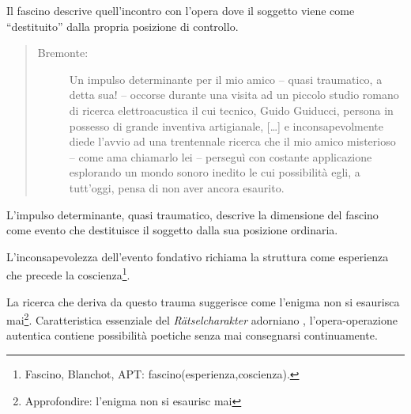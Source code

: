 Il fascino descrive quell'incontro con l'opera dove il soggetto viene come
“destituito” dalla propria posizione di controllo.

\begin{quote}
  \begin{sf}
    \small
    \begin{description}
      \item[Bremonte:] %
      Un impulso determinante per il mio amico – quasi traumatico, a detta sua! –
      occorse durante una visita ad un piccolo studio romano di ricerca
      elettroacustica il cui tecnico, Guido Guiducci, persona in possesso di
      grande inventiva artigianale,%
      [\ldots] e inconsapevolmente diede l’avvio ad una trentennale ricerca che il mio
      amico misterioso – come ama chiamarlo lei – perseguì con costante
      applicazione esplorando un mondo sonoro inedito le cui possibilità egli, a
      tutt’oggi, pensa di non aver ancora esaurito.
    \end{description}
  \end{sf}
\end{quote}

L'impulso determinante, quasi traumatico, descrive la dimensione del fascino
come evento che destituisce il soggetto dalla sua posizione ordinaria.

L'inconsapevolezza dell'evento fondativo richiama la struttura come esperienza
che precede la coscienza\footnote{Fascino, Blanchot, APT: fascino(esperienza,coscienza).}.

La ricerca che deriva da questo trauma suggerisce come l'enigma non si esaurisca
mai\footnote{Approfondire: l'enigma non si esaurisc mai}. Caratteristica
essenziale del \emph{Rätselcharakter} adorniano \cite{adorno}, l'opera-operazione
autentica contiene possibilità poetiche senza mai consegnarsi continuamente.

